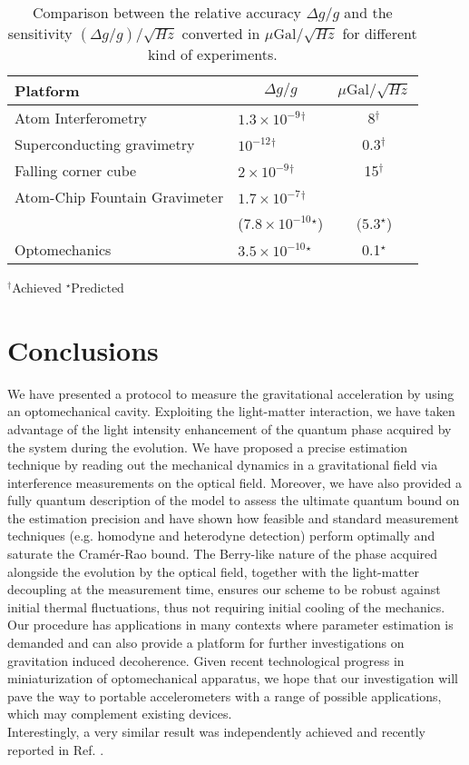 \documentclass[aps,twocolumn,preprintnumbers,amsmath,amssymb]{revtex4}
\begin{document}
\begin{table}
\begin{tabular}{llc}
\hline
Platform&
\multicolumn{1}{c}{$\Delta g/g$} &
\multicolumn{1}{c}{$\mu\mathrm{Gal}/\sqrt{Hz}$}\\ \hline
Atom Interferometry  \cite{muller2008}& $1.3\times 10^{-9}$$^{\dag}$&8$^{\dag}$ \\
Superconducting gravimetry \cite{instrument}&$10^{-12}$$^{\dag}$& 0.3$^{\dag}$ \\
Falling corner cube \cite{lacoste}&$2\times 10^{-9}$$^{\dag}$&15$^{\dag}$ \\
Atom-Chip Fountain Gravimeter \cite{abend2016}&$1.7\times10^{-7}$$^{\dag}$&\\
&($7.8\times10^{-10}$$^{\star}$)&$(5.3^{\star}$)\\
Optomechanics&$3.5\times10^{-10}$$^{\star}$&0.1$^{\star}$\\
\hline
\end{tabular}
\raggedright
$^{\dag}$Achieved $^{\star}$Predicted
\caption
{Comparison between the relative accuracy $\Delta g/g$ and the sensitivity $(\Delta g/g)/\sqrt{Hz}$ converted in $\mu\mathrm{Gal}/\sqrt{Hz}$ for different kind of experiments.}
\label{Tab1}

\end{table}

\section{\label{sec:Conclusions} Conclusions}

We have presented a protocol to measure the gravitational acceleration by using an optomechanical cavity. Exploiting the light-matter interaction, we have taken advantage of the light intensity enhancement of the quantum phase acquired by the system during the evolution. We have proposed a precise estimation technique by reading out the mechanical dynamics in a gravitational field via interference measurements on the optical field. Moreover, we have also provided a fully quantum description of the model to assess the ultimate quantum bound on the estimation precision and have shown how feasible and standard measurement techniques (e.g. homodyne and heterodyne detection) perform optimally and saturate the Cram\'er-Rao bound. The Berry-like nature of the phase acquired alongside the evolution by the optical field, together with the light-matter decoupling at the measurement time, ensures our scheme to be robust against initial thermal fluctuations, thus not requiring initial cooling of the mechanics. Our procedure has applications in many contexts where parameter estimation is demanded and can also provide a platform for further investigations on gravitation induced decoherence. Given recent technological progress in miniaturization of optomechanical apparatus, we hope that our investigation will pave the way to portable accelerometers with a range of possible applications, which may complement existing devices.\\
Interestingly, a very similar result was independently achieved and recently reported in Ref. \cite{qvarfort2017}.
\end{document}
